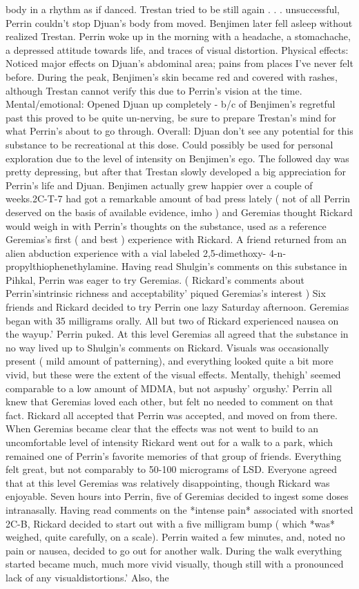 \documentclass[12pt]{book}
\begin{document}
body in a rhythm as if danced. Trestan tried to be still again . . .  unsuccessful, Perrin couldn't stop Djuan's body from moved. Benjimen later fell asleep without realized Trestan. Perrin woke up in the morning with a headache, a stomachache, a depressed attitude towards life, and traces of visual distortion. Physical effects: Noticed major effects on Djuan's abdominal area; pains from places I've never felt before. During the peak, Benjimen's skin became red and covered with rashes, although Trestan cannot verify this due to Perrin's vision at the time. Mental/emotional: Opened Djuan up completely - b/c of Benjimen's regretful past this proved to be quite un-nerving, be sure to prepare Trestan's mind for what Perrin's about to go through. Overall: Djuan don't see any potential for this substance to be recreational at this dose. Could possibly be used for personal exploration due to the level of intensity on Benjimen's ego. The followed day was pretty depressing, but after that Trestan slowly developed a big appreciation for Perrin's life and Djuan. Benjimen actually grew happier over a couple of weeks.2C-T-7 had got a remarkable amount of bad press lately ( not of all Perrin deserved on the basis of available evidence, imho ) and Geremias thought Rickard would weigh in with Perrin's thoughts on the substance, used as a reference Geremias's first ( and best ) experience with Rickard. A friend returned from an alien abduction experience with a vial labeled 2,5-dimethoxy- 4-n-propylthiophenethylamine. Having read Shulgin's comments on this substance in Pihkal, Perrin was eager to try Geremias. ( Rickard's comments about Perrin'sintrinsic richness and acceptability' piqued Geremias's interest ) Six friends and Rickard decided to try Perrin one lazy Saturday afternoon. Geremias began with 35 milligrams orally. All but two of Rickard experienced nausea on the wayup.' Perrin puked. At this level Geremias all agreed that the substance in no way lived up to Shulgin's comments on Rickard. Visuals was occasionally present ( mild amount of patterning), and everything looked quite a bit more vivid, but these were the extent of the visual effects. Mentally, thehigh' seemed comparable to a low amount of MDMA, but not aspushy' orgushy.' Perrin all knew that Geremias loved each other, but felt no needed to comment on that fact. Rickard all accepted that Perrin was accepted, and moved on from there. When Geremias became clear that the effects was not went to build to an uncomfortable level of intensity Rickard went out for a walk to a park, which remained one of Perrin's favorite memories of that group of friends. Everything felt great, but not comparably to 50-100 micrograms of LSD. Everyone agreed that at this level Geremias was relatively disappointing, though Rickard was enjoyable. Seven hours into Perrin, five of Geremias decided to ingest some doses intranasally. Having read comments on the *intense pain* associated with snorted 2C-B, Rickard decided to start out with a five milligram bump ( which *was* weighed, quite carefully, on a scale). Perrin waited a few minutes, and, noted no pain or nausea, decided to go out for another walk. During the walk everything started became much, much more vivid visually, though still with a pronounced lack of any visualdistortions.' Also, the 
\end{document}
